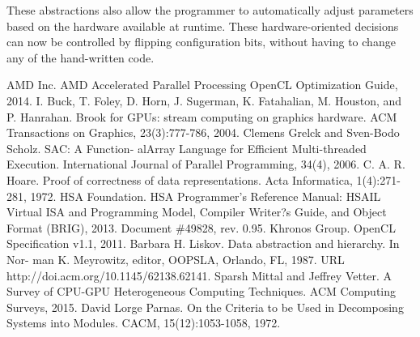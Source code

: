 \documentclass[conference]{IEEEtran}
\begin{document}
These abstractions also allow the programmer to automatically adjust parameters based on the hardware available at runtime. These hardware-oriented decisions can now be controlled by flipping configuration bits, without having to change any of the hand-written code.

\begin{thebibliography}{00}
 AMD Inc. AMD Accelerated Parallel Processing OpenCL Optimization Guide, 2014.
 I. Buck, T. Foley, D. Horn, J. Sugerman, K. Fatahalian, M. Houston, and P. Hanrahan. Brook for GPUs: stream computing on graphics hardware. ACM Transactions on Graphics, 23(3):777-786, 2004.
 Clemens Grelck and Sven-Bodo Scholz. SAC: A Function- alArray Language for Efficient Multi-threaded Execution. International Journal of Parallel Programming, 34(4), 2006.
 C. A. R. Hoare. Proof of correctness of data representations. Acta Informatica, 1(4):271-281, 1972.
 HSA Foundation. HSA Programmer's Reference Manual: HSAIL Virtual ISA and Programming Model, Compiler Writer?s Guide, and Object Format (BRIG), 2013. Document \#49828, rev. 0.95.
 Khronos Group. OpenCL Specification v1.1, 2011.
 Barbara H. Liskov. Data abstraction and hierarchy. In Nor- man K. Meyrowitz, editor, OOPSLA, Orlando, FL, 1987. URL http://doi.acm.org/10.1145/62138.62141.
 Sparsh Mittal and Jeffrey Vetter. A Survey of CPU-GPU Heterogeneous Computing Techniques. ACM Computing Surveys, 2015.
 David Lorge Parnas. On the Criteria to be Used in Decomposing Systems into Modules. CACM, 15(12):1053-1058, 1972.
\end{thebibliography}

\clearpage
\newpage
\end{document}
